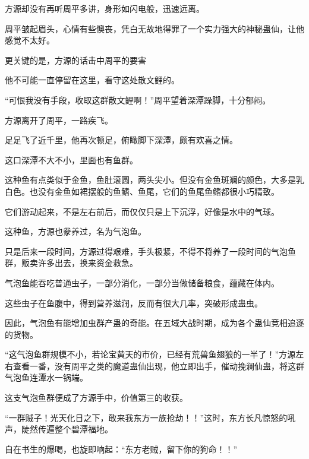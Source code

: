 \begin{this_body}
方源却没有再听周平多讲，身形如闪电般，迅速远离。

周平皱起眉头，心情有些懊丧，凭白无故地得罪了一个实力强大的神秘蛊仙，让他感觉不太好。

更关键的是，方源的话击中周平的要害

他不可能一直停留在这里，看守这处散文鲤的。

“可恨我没有手段，收取这群散文鲤啊！”周平望着深潭跺脚，十分郁闷。

方源离开了周平，一路疾飞。

足足飞了近千里，他再次顿足，俯瞰脚下深潭，颇有欢喜之情。

这口深潭不大不小，里面也有鱼群。

这种鱼有点类似于金鱼，鱼肚滚圆，两头尖小。但没有金鱼斑斓的颜色，大多是乳白色。也没有金鱼如裙摆般的鱼鳍、鱼尾，它们的鱼尾鱼鳍都很小巧精致。

它们游动起来，不是左右前后，而仅仅只是上下沉浮，好像是水中的气球。

这种鱼，方源也豢养过，名为气泡鱼。

只是后来一段时间，方源过得艰难，手头极紧，不得不将养了一段时间的气泡鱼群，贩卖许多出去，换来资金救急。

气泡鱼能吞吃普通虫子，一部分消化，一部分当做储备粮食，蕴藏在体内。

这些虫子在鱼腹中，得到营养滋润，反而有很大几率，突破形成蛊虫。

因此，气泡鱼有能增加虫群产蛊的奇能。在五域大战时期，成为各个蛊仙竞相追逐的货物。

“这气泡鱼群规模不小，若论宝黄天的市价，已经有荒兽鱼翅狼的一半了！”方源左右查看一番，没有周平之类的魔道蛊仙出现，他立即出手，催动挽澜仙蛊，将这群气泡鱼连潭水一锅端。

这支气泡鱼群便成了方源手中，价值第三的收获。

“一群贼子！光天化日之下，敢来我东方一族抢劫！！”这时，东方长凡惊怒的吼声，陡然传遍整个碧潭福地。

自在书生的爆喝，也旋即响起：“东方老贼，留下你的狗命！！”

\end{this_body}

